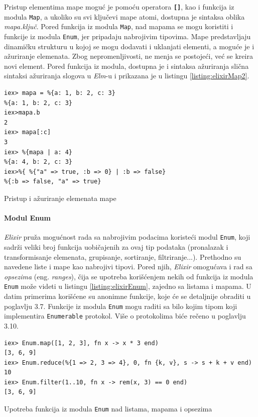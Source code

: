 \documentclass[12pt,oneside]{memoir}
\begin{document}
Pristup elementima mape moguć je pomoću operatora \texttt{\textbf{[\smallskip]}}, kao i
funkcija iz modula \texttt{Map}, a ukoliko su svi ključevi mape atomi, dostupna je 
sintaksa oblika \emph{mapa.ključ}. Pored funkcija iz modula \texttt{Map}, nad mapama se
mogu koristiti i funkcije iz modula \texttt{Enum}, jer pripadaju nabrojivim tipovima.
Mape predstavljaju dinamičku strukturu u kojoj se mogu dodavati i uklanjati elementi,
a moguće je i ažuriranje elemenata. Zbog nepromenljivosti, ne menja se postojeći, već se
kreira novi element. Pored funkcija iz modula, dostupna je i sintaksa ažuriranja slična 
sintaksi ažuriranja slogova u \emph{Elm}-u i prikazana je u listingu \ref{listing:elixirMap2}. 
\begin{listing}[!h]
\begin{verbatim}
iex> mapa = %{a: 1, b: 2, c: 3}
%{a: 1, b: 2, c: 3}
iex>mapa.b
2
iex> mapa[:c]
3
iex> %{mapa | a: 4}
%{a: 4, b: 2, c: 3}
iex>%{ %{"a" => true, :b => 0} | :b => false}
%{:b => false, "a" => true}
\end{verbatim}
\caption{Pristup i ažuriranje elemenata mape}
\label{listing:elixirMap2}
\end{listing}
\paragraph{Modul Enum}
\emph{Elixir} pruža mogućnost rada sa nabrojivim podacima koristeći modul \texttt{Enum}, koji sadrži
veliki broj funkcija uobičajenih za ovaj tip podataka (pronalazak i transformisanje elemenata,
grupisanje, sortiranje, filtriranje...). Prethodno su navedene liste i mape kao nabrojivi tipovi.
Pored njih, \emph{Elixir} omogućava i rad sa \emph{opsezima} (eng. \emph{ranges}), čija se
upotreba korišćenjem nekih od funkcija iz modula \texttt{Enum} može videti u listingu
\ref{listing:elixirEnum}, zajedno sa listama i mapama. U datim primerima korišćene su anonimne
funkcije, koje će se detaljnije obraditi u poglavlju 3.7. Funkcije iz modula \texttt{Enum}
mogu raditi sa bilo kojim tipom koji implementira \texttt{Enumerable} protokol. Više
o protokolima biće rečeno u poglavlju 3.10.
\begin{listing}[!ht]
\begin{verbatim}
iex> Enum.map([1, 2, 3], fn x -> x * 3 end)
[3, 6, 9]
iex> Enum.reduce(%{1 => 2, 3 => 4}, 0, fn {k, v}, s -> s + k + v end)
10
iex> Enum.filter(1..10, fn x -> rem(x, 3) == 0 end)
[3, 6, 9]
\end{verbatim}
\caption{Upotreba funkcija iz modula \texttt{Enum} nad listama, mapama i opsezima}
\label{listing:elixirEnum}
\end{listing}
\end{document}
